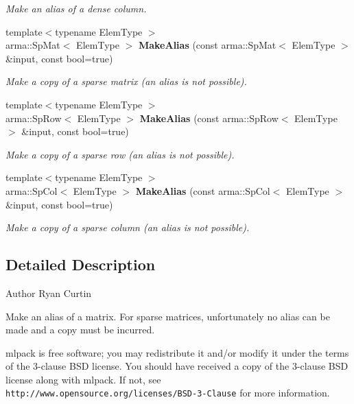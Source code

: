 \begin{DoxyCompactItemize}
\begin{DoxyCompactList}\small\item\em Make an alias of a dense column. \end{DoxyCompactList}\item 
{\footnotesize template$<$typename Elem\+Type $>$ }\\arma\+::\+Sp\+Mat$<$ Elem\+Type $>$ \textbf{ Make\+Alias} (const arma\+::\+Sp\+Mat$<$ Elem\+Type $>$ \&input, const bool=true)
\begin{DoxyCompactList}\small\item\em Make a copy of a sparse matrix (an alias is not possible). \end{DoxyCompactList}\item 
{\footnotesize template$<$typename Elem\+Type $>$ }\\arma\+::\+Sp\+Row$<$ Elem\+Type $>$ \textbf{ Make\+Alias} (const arma\+::\+Sp\+Row$<$ Elem\+Type $>$ \&input, const bool=true)
\begin{DoxyCompactList}\small\item\em Make a copy of a sparse row (an alias is not possible). \end{DoxyCompactList}\item 
{\footnotesize template$<$typename Elem\+Type $>$ }\\arma\+::\+Sp\+Col$<$ Elem\+Type $>$ \textbf{ Make\+Alias} (const arma\+::\+Sp\+Col$<$ Elem\+Type $>$ \&input, const bool=true)
\begin{DoxyCompactList}\small\item\em Make a copy of a sparse column (an alias is not possible). \end{DoxyCompactList}\end{DoxyCompactItemize}


\subsection{Detailed Description}
\begin{DoxyAuthor}{Author}
Ryan Curtin
\end{DoxyAuthor}
Make an alias of a matrix. For sparse matrices, unfortunately no alias can be made and a copy must be incurred.

mlpack is free software; you may redistribute it and/or modify it under the terms of the 3-\/clause B\+SD license. You should have received a copy of the 3-\/clause B\+SD license along with mlpack. If not, see {\tt http\+://www.\+opensource.\+org/licenses/\+B\+S\+D-\/3-\/\+Clause} for more information. 
